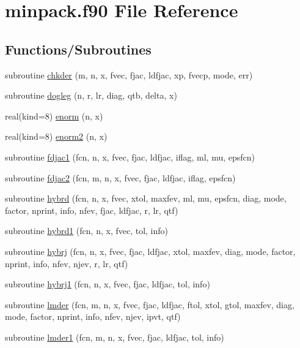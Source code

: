 \hypertarget{minpack_8f90}{
\section{minpack.f90 File Reference}
\label{minpack_8f90}
}
\subsection*{Functions/Subroutines}
\begin{DoxyCompactItemize}
\item 
subroutine \hyperlink{minpack_8f90_a0850d60ecd544bc0acd3fc391ff375ac}{chkder} (m, n, x, fvec, fjac, ldfjac, xp, fvecp, mode, err)
\item 
subroutine \hyperlink{minpack_8f90_ab5a1319962e4855e0a2b7a7431085275}{dogleg} (n, r, lr, diag, qtb, delta, x)
\item 
real(kind=8) \hyperlink{minpack_8f90_ad0e97506d6d14388bdef9f2f8cc6aceb}{enorm} (n, x)
\item 
real(kind=8) \hyperlink{minpack_8f90_a31f0bacf77d7a302e52b8abd3750c970}{enorm2} (n, x)
\item 
subroutine \hyperlink{minpack_8f90_a327303574ddecf90e74bf7aaa64b5509}{fdjac1} (fcn, n, x, fvec, fjac, ldfjac, iflag, ml, mu, epsfcn)
\item 
subroutine \hyperlink{minpack_8f90_a93f854f4490882e08d928f8a84ac43f7}{fdjac2} (fcn, m, n, x, fvec, fjac, ldfjac, iflag, epsfcn)
\item 
subroutine \hyperlink{minpack_8f90_a1e525d0d69e43bfda5f82e3bc4745b2f}{hybrd} (fcn, n, x, fvec, xtol, maxfev, ml, mu, epsfcn, diag, mode, factor, nprint, info, nfev, fjac, ldfjac, r, lr, qtf)
\item 
subroutine \hyperlink{minpack_8f90_a314aebdd90b16a874c0879d291a2190d}{hybrd1} (fcn, n, x, fvec, tol, info)
\item 
subroutine \hyperlink{minpack_8f90_a53ab26dfa98e1e91ba7a8c3e5f83ad13}{hybrj} (fcn, n, x, fvec, fjac, ldfjac, xtol, maxfev, diag, mode, factor, nprint, info, nfev, njev, r, lr, qtf)
\item 
subroutine \hyperlink{minpack_8f90_afefee19843910dca7f59c228bf69749d}{hybrj1} (fcn, n, x, fvec, fjac, ldfjac, tol, info)
\item 
subroutine \hyperlink{minpack_8f90_a29cf549303bc0ced9cb2e1ef2da0234b}{lmder} (fcn, m, n, x, fvec, fjac, ldfjac, ftol, xtol, gtol, maxfev, diag, mode, factor, nprint, info, nfev, njev, ipvt, qtf)
\item 
subroutine \hyperlink{minpack_8f90_ab4dbf9a20a957dfb72d70219dd6ad6d4}{lmder1} (fcn, m, n, x, fvec, fjac, ldfjac, tol, info)

\end{DoxyCompactItemize}
